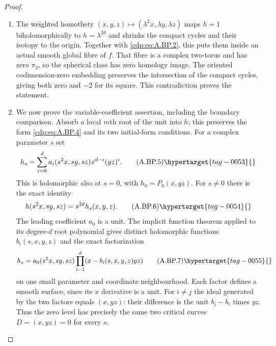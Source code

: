 \begin{proof}
\begin{enumerate}[label={$\langle1\rangle$\arabic*.},leftmargin=*]
\item The weighted homothety
$(x,y,z)\mapsto(\lambda^2x,\lambda y,\lambda z)$
maps $h=1$ biholomorphically to $h=\lambda^{2d}$
and shrinks the compact cycles and their isotopy
to the origin. Together with \eqref{cdp:eq:A.BP.2}, this puts
them inside an actual smooth global fibre of $f$.
That fibre is a complex two-torus and has zero
$\pi_2$, so the spherical class has zero homology
image. The oriented codimension-zero embedding
preserves the intersection of the compact cycles,
giving both zero and $-2$ for its square. This
contradiction proves the statement.

\item We now prove the variable-coefficient assertion,
including the boundary comparison. Absorb a local
$m$th root of the unit into $h$; this preserves the
form \eqref{cdp:eq:A.BP.4} and its two initial-form conditions.
For a complex parameter $s$ set
\[
 h_s=\sum_{i=0}^d a_i(s^2x,sy,sz)x^{d-i}(yz)^i.
                                                        \tag{A.BP.5}\hypertarget{tag-0053}{}\label{cdp:eq:A.BP.5}
\]
This is holomorphic also at $s=0$, with
$h_0=P_0(x,yz)$. For $s\ne0$ there is the exact
identity
\[
       h(s^2x,sy,sz)=s^{2d}h_s(x,y,z).           \tag{A.BP.6}\hypertarget{tag-0054}{}\label{cdp:eq:A.BP.6}
\]
The leading coefficient $a_0$ is a unit. The implicit
function theorem applied to its degree-$d$ root
polynomial gives distinct holomorphic functions
$b_i(s,x,y,z)$ and the exact factorization
\[
       h_s=a_0(s^2x,sy,sz)
                     \prod_{i=1}^d(x-b_i(s,x,y,z)yz)
                                                        \tag{A.BP.7}\hypertarget{tag-0055}{}\label{cdp:eq:A.BP.7}
\]
on one small parameter and coordinate neighbourhood.
Each factor defines a smooth surface, since its
$x$ derivative is a unit. For $i\ne j$ the ideal
generated by the two factors equals $(x,yz)$:
their difference is the unit $b_j-b_i$ times $yz$.
Thus the zero level has precisely the same two
critical curves $D=(x,yz)=0$ for every $s$.


\end{enumerate}
\end{proof}

